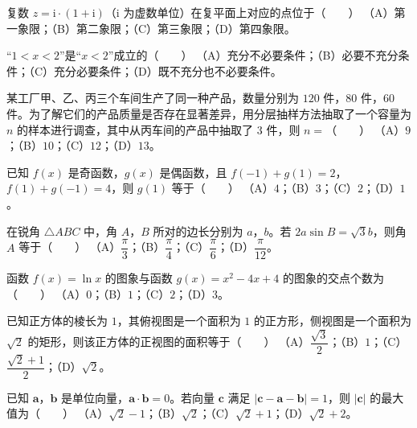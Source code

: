 \begin{question}
复数 $z=\mathrm i\cdot(1+\mathrm i)$（$\mathrm i$ 为虚数单位）在复平面上对应的点位于\mbox{（　　）}
（A）第一象限；（B）第二象限；（C）第三象限；（D）第四象限。
\end{question}
\begin{question}
“$1<x<2$”是“$x<2$”成立的\mbox{（　　）}
（A）充分不必要条件；（B）必要不充分条件；（C）充分必要条件；（D）既不充分也不必要条件。
\end{question}
\begin{question}
某工厂甲、乙、丙三个车间生产了同一种产品，数量分别为 $120$ 件，$80$ 件，$60$ 件。为了解它们的产品质量是否存在显著差异，用分层抽样方法抽取了一个容量为 $n$ 的样本进行调查，其中从丙车间的产品中抽取了 $3$ 件，则 $n=$\mbox{（　　）}
（A）$9$；（B）$10$；（C）$12$；（D）$13$。
\end{question}
\begin{question}
已知 $f(x)$ 是奇函数，$g(x)$ 是偶函数，且 $f(-1)+g(1)=2$，$f(1)+g(-1)=4$，则 $g(1)$ 等于\mbox{（　　）}
（A）$4$；（B）$3$；（C）$2$；（D）$1$。
\end{question}
\begin{question}
在锐角 $\triangle ABC$ 中，角 $A$，$B$ 所对的边长分别为 $a$，$b$。若 $2a\sin B=\sqrt3b$，则角 $A$ 等于\mbox{（　　）}
（A）$\dfrac\pi3$；（B）$\dfrac\pi4$；（C）$\dfrac\pi6$；（D）$\dfrac\pi{12}$。
\end{question}
\begin{question}
函数 $f(x)=\ln x$ 的图象与函数 $g(x)=x^2-4x+4$ 的图象的交点个数为\mbox{（　　）}
（A）$0$；（B）$1$；（C）$2$；（D）$3$。
\end{question}
\begin{question}
已知正方体的棱长为 $1$，其俯视图是一个面积为 $1$ 的正方形，侧视图是一个面积为 $\sqrt2$ 的矩形，则该正方体的正视图的面积等于\mbox{（　　）}
（A）$\dfrac{\sqrt3}2$；（B）$1$；（C）$\dfrac{\sqrt2+1}2$；（D）$\sqrt2$。
\end{question}
\begin{question}
已知 $\boldsymbol a$，$\boldsymbol b$ 是单位向量，$\boldsymbol a\cdot\boldsymbol b=0$。若向量 $\boldsymbol c$ 满足 $|\boldsymbol c-\boldsymbol a-\boldsymbol b|=1$，则 $|\boldsymbol c|$ 的最大值为\mbox{（　　）}
（A）$\sqrt2-1$；（B）$\sqrt2$；（C）$\sqrt2+1$；（D）$\sqrt2+2$。
\end{question}
